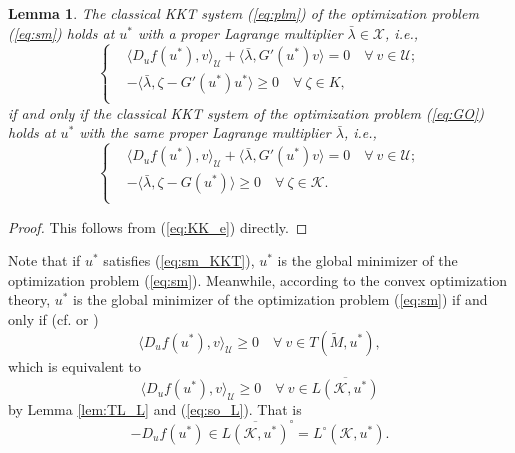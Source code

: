 \documentclass[leqno]{amsart}
\newtheorem{lemma}[theorem]{Lemma}
\theoremstyle{definition}
\begin{document}
\begin{lemma}\label{lem:so_KKT}
The classical KKT system (\ref{eq:plm}) of the optimization problem (\ref{eq:sm}) holds at $u^*$ with a proper Lagrange multiplier $\bar{\lambda}\in \mathcal{X}$, i.e., 
\begin{equation}\label{eq:sm_KKT}
\left\{
\begin{aligned}
&\langle D_uf(u^*), v\rangle_{\mathcal{U}} + \langle \bar{\lambda}, G'(u^*)v\rangle = 0\quad \forall\ v\in \mathcal{U};\\
&- \langle \bar{\lambda}, \zeta - G'(u^*)u^*\rangle \geq 0\quad \forall\ \zeta\in  K,\\
\end{aligned}
\right.
\end{equation}
if and only if the classical KKT system of the optimization problem (\ref{eq:GO}) holds at $u^*$ with the same proper Lagrange multiplier $\bar{\lambda}$, i.e.,
\begin{equation}\label{eq:GO_KKT}
\left\{
\begin{aligned}
&\langle D_uf(u^*), v\rangle_{\mathcal{U}} + \langle \bar{\lambda}, G'(u^*)v\rangle = 0\quad \forall\ v\in \mathcal{U};\\
&- \langle \bar{\lambda}, \zeta - G(u^*)\rangle \geq 0\quad \forall\ \zeta\in  \mathcal{K}.\\
\end{aligned}
\right.
\end{equation}
\end{lemma}
\begin{proof}
This follows from (\ref{eq:KK_e}) directly.
\end{proof}

Note that if $u^*$ satisfies (\ref{eq:sm_KKT}), $u^*$ is the global minimizer of the optimization problem (\ref{eq:sm}).
Meanwhile, according to the convex optimization theory, $u^*$ is the global minimizer of the optimization problem (\ref{eq:sm}) if and only if (cf.  \cite[Theorem 1]{guignard1969generalized} or \cite[Theorem 4.14 and Theorem 4.19]{jahn2020introduction})
$$\langle D_uf(u^*), v\rangle_\mathcal{U}\geq 0\quad \forall\ v\in T(\tilde{M},u^*),$$
which is equivalent to
$$\langle D_uf(u^*), v\rangle_\mathcal{U}\geq 0\quad \forall\ v\in \overline{L(\mathcal{K},u^*)}$$
by Lemma \ref{lem:TL_L} and (\ref{eq:so_L}). That is
\begin{equation}\label{eq:c_iff}
-D_uf(u^*) \in \overline{L(\mathcal{K}, u^*)}^\circ = L^\circ(\mathcal{K}, u^*).
\end{equation}
\end{document}
